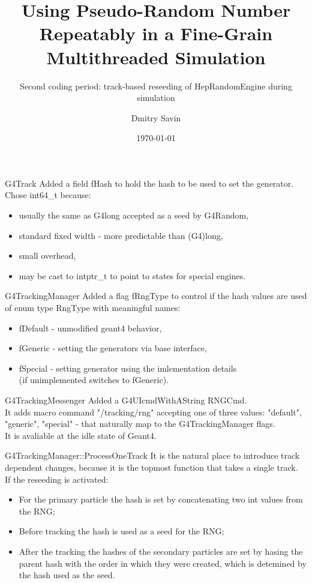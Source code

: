 \documentclass[aspectratio=169, 14pt]{beamer}
\title{Using Pseudo-Random Number Repeatably in a Fine-Grain Multithreaded Simulation}
\subtitle{Second coding period: track-based reseeding of HepRandomEngine during simulation}
\author{Dmitry Savin}
\date{\today}
\begin{document}
\begin{large}

 \frame{\titlepage}

 \begin{frame}{G4Track}
  Added a field fHash to hold the hash to be used to set the generator.
  Chose int64\_t because:
  \begin{itemize}
   \item usually the same as G4long accepted as a seed by G4Random,
   \item standard fixed width - more predictable than (G4)long,
   \item small overhead,
   \item may be cast to intptr\_t to point to states for special engines.
  \end{itemize}
 \end{frame}

 \begin{frame}{G4TrackingManager}
  Added a flag fRngType to control if the hash values are used of enum type
  RngType with meaningful names:
  \begin{itemize}
   \item fDefault - unmodified geant4 behavior,
   \item fGeneric - setting the generators via base interface,
   \item fSpecial - setting generator using the imlementation details\\
    (if unimplemented switches to fGeneric).
  \end{itemize}
 \end{frame}

 \begin{frame}{G4TrackingMessenger}
  Added a G4UIcmdWithAString RNGCmd.\\
  It adds macro command "/tracking/rng" accepting one of three values:
  "default", "generic", "special" - 
  that naturally map to the G4TrackingManager flags.\\
  It is avaliable at the idle state of Geant4.
 \end{frame}

 \begin{frame}{G4TrackingManager::ProcessOneTrack}
  It is the natural place to introduce track dependent changes,
  because it is the topmost function that takes a single track.\\
  If the reseeding is activated:
  \begin{itemize}
   \item For the primary particle the hash is set by concatenating two int values from the RNG;
   \item Before tracking the hash is used as a seed for the RNG;
   \item After the tracking the hashes of the secondary particles are set
    by hasing the parent hash with the order in which they were created,
    which is detemined by the hash used as the seed.
  \end{itemize}
 \end{frame}
 

\end{large}
\end{document}
